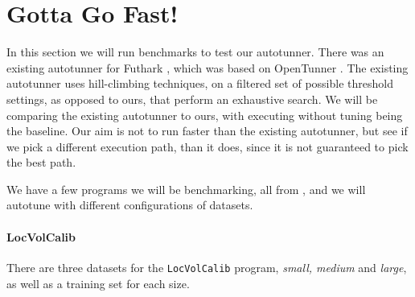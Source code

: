 \section{Gotta Go Fast!}
In this section we will run benchmarks to test our autotunner. There was an
existing autotunner for Futhark \cite{oldtune}, which was based on OpenTunner
\cite{opentunner}. The existing autotunner uses hill-climbing techniques, on a
filtered set of possible threshold settings, as opposed to ours, that perform
an exhaustive search. We will be comparing the existing autotunner to ours,
with executing without tuning being the baseline. 
Our aim is not to run faster than the existing autotunner, but see if we pick a
different execution path, than it does, since it is not guaranteed to pick the
best path.

We have a few programs we will be benchmarking, all from \cite{ppopp}, and we
will autotune with different configurations of datasets.
\paragraph{LocVolCalib}
There are three datasets for the \texttt{LocVolCalib} program, \textit{small,
medium} and \textit{large}, as well as a training set for each size.

